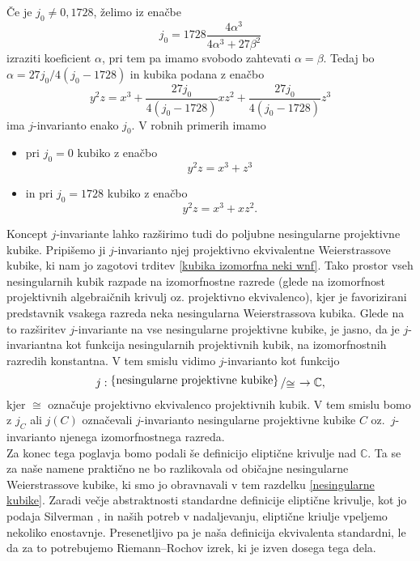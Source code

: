 \documentclass[mat1]{fmfdelo}
\numberwithin{equation}{section}
\newcommand{\C}{\mathbb C}
\newcommand{\bigslant}[2]{{\raisebox{.2em}{$#1$}\left/\raisebox{-.2em}{$#2$}\right.}}
\theoremstyle{definition}
\begin{document}
Če je $j_0 \neq 0, 1728$, želimo iz enačbe
\[
    j_0 = 1728\frac{4\alpha^3}{4\alpha^3 + 27\beta^2}  
\]
izraziti koeficient $\alpha$, pri tem pa imamo svobodo zahtevati $\alpha = \beta$. Tedaj bo $\alpha = 27j_0/4(j_0 - 1728)$ in kubika podana z enačbo 
\[
  y^2z = x^3 + \frac{27j_0}{4(j_0 - 1728)}xz^2 + \frac{27j_0}{4(j_0 - 1728)}z^3
\] 
ima $j$-invarianto enako $j_0$. V robnih primerih imamo

\begin{itemize}
    \item pri $j_0 = 0$ kubiko z enačbo 
    \[
        y^2z = x^3 + z^3
    \]
    \item in pri $j_0 = 1728$ kubiko z enačbo
    \[
        y^2z = x^3 + xz^2.
    \]
\end{itemize}

Koncept $j$-invariante lahko razširimo tudi do poljubne nesingularne projektivne kubike. Pripišemo ji $j$-invarianto njej projektivno ekvivalentne Weierstrassove kubike, ki nam jo zagotovi trditev \ref{kubika izomorfna neki wnf}. Tako prostor vseh nesingularnih kubik razpade na izomorfnostne razrede (glede na izomorfnost projektivnih algebraičnih krivulj oz. projektivno ekvivalenco), kjer je favorizirani predstavnik vsakega razreda neka nesingularna Weierstrassova kubika. Glede na to razširitev $j$-invariante na vse nesingularne projektivne kubike, je jasno, da je $j$-invariantna kot funkcija nesingularnih projektivnih kubik, na izomorfnostnih razredih konstantna. V tem smislu vidimo $j$-invarianto kot funkcijo
\[
    j: \bigslant{\{\text{nesingularne projektivne kubike}\}}{\cong} \to \C,
\]
kjer $\cong$ označuje projektivno ekvivalenco projektivnih kubik. V tem smislu bomo z $j_C$ ali $j(C)$ označevali $j$-invarianto nesingularne projektivne kubike $C$ oz.\ $j$-invarianto njenega izomorfnostnega razreda.
\\

Za konec tega poglavja bomo podali še definicijo eliptične krivulje nad $\C$. Ta se za naše namene praktično ne bo razlikovala od običajne nesingularne Weierstrassove kubike, ki smo jo obravnavali v tem razdelku \ref{nesingularne kubike}. Zaradi večje abstraktnosti standardne definicije eliptične krivulje, kot jo podaja Silverman \cite[III. \S 3]{Silverman}, in naših potreb v nadaljevanju, eliptične kriulje vpeljemo nekoliko enostavnje. Presenetljivo pa je
naša definicija ekvivalenta standardni, le da za to potrebujemo Riemann--Rochov izrek, ki je izven dosega tega dela.
\end{document}
